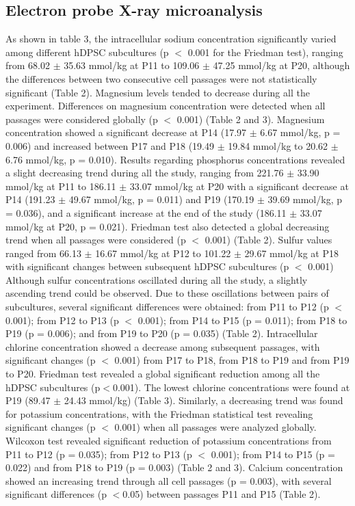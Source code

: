 \documentclass[a4paper,twocolumn,12pt]{article}
\begin{document}
\subsection{Electron probe X-ray microanalysis}
As shown in table 3, the intracellular sodium concentration significantly varied among different hDPSC subcultures (p $<$ 0.001 for the Friedman test), ranging from 68.02 $\pm$ 35.63 mmol/kg at P11 to 109.06 $\pm$ 47.25 mmol/kg at P20, although the differences between two consecutive cell passages were not statistically significant (Table 2).
Magnesium levels tended to decrease during all the experiment. Differences on magnesium concentration were detected when all passages were considered globally (p $<$ 0.001) (Table 2 and 3). Magnesium concentration showed a significant decrease at P14 (17.97 $\pm$ 6.67 mmol/kg, p = 0.006) and increased between P17 and P18 (19.49 $\pm$ 19.84 mmol/kg to 20.62 $\pm$ 6.76 mmol/kg, p = 0.010). 
Results regarding phosphorus concentrations revealed a slight decreasing trend during all the study, ranging from 221.76 $\pm$ 33.90 mmol/kg at P11 to 186.11 $\pm$ 33.07 mmol/kg at P20 with a significant decrease at P14 (191.23 $\pm$ 49.67 mmol/kg, p = 0.011) and P19 (170.19 $\pm$ 39.69 mmol/kg, p = 0.036), and a significant increase at the end of the study (186.11 $\pm$ 33.07 mmol/kg at P20, p = 0.021). Friedman test also detected a global decreasing trend when all passages were considered (p $<$ 0.001) (Table 2).
Sulfur values ranged from 66.13 $\pm$ 16.67 mmol/kg at P12 to 101.22 $\pm$ 29.67 mmol/kg at P18 with significant changes between subsequent hDPSC subcultures (p $<$ 0.001) Although sulfur concentrations oscillated during all the study, a slightly ascending trend could be observed. Due to these oscillations between pairs of subcultures, several significant differences were obtained: from P11 to P12 (p $<$ 0.001); from P12 to P13 (p $<$ 0.001); from P14 to P15 (p = 0.011); from P18 to P19 (p = 0.006); and from P19 to P20 (p = 0.035) (Table 2).
Intracellular chlorine concentration showed a decrease among subsequent passages, with significant changes (p $<$ 0.001) from P17 to P18, from P18 to P19 and from P19 to P20. Friedman test revealed a global significant reduction among all the hDPSC subcultures (p$<$0.001). The lowest chlorine concentrations were found at P19 (89.47 $\pm$ 24.43 mmol/kg) (Table 3).
Similarly, a decreasing trend was found for potassium concentrations, with the Friedman statistical test revealing significant changes (p $<$ 0.001) when all passages were analyzed globally. Wilcoxon test revealed significant reduction of potassium concentrations from P11 to P12 (p = 0.035); from P12 to P13 (p $<$ 0.001); from P14 to P15 (p = 0.022) and from P18 to P19 (p = 0.003) (Table 2 and 3).
Calcium concentration showed an increasing trend through all cell passages (p = 0.003), with several significant differences (p $<$0.05) between passages P11 and P15 (Table 2).
\end{document}
